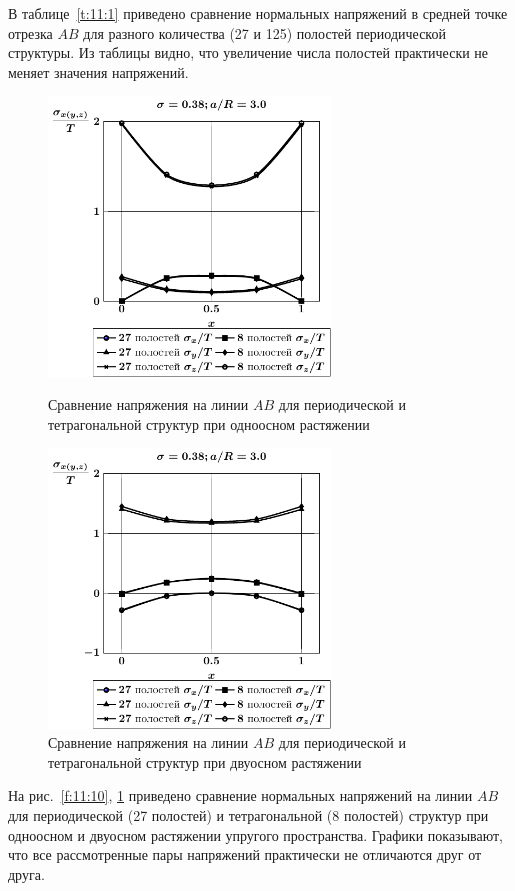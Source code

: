 В таблице~\ref{t:11:1} приведено сравнение нормальных напряжений в средней точке отрезка $AB$ для разного количества (27 и 125) полостей периодической структуры. Из таблицы видно, что увеличение числа полостей практически не меняет значения напряжений.

\begin{figure}[h!]
\centering\footnotesize
\parbox[b]{7.5cm}{\centering\includegraphics[width=7.5cm]{spheres-cav27-8-a30-t1.pdf}
\caption{Сравнение напряжения на линии $AB$ для периодической и тетрагональной структур при одноосном растяжении
\label{f:11:10}}}\hfil\hfil
\parbox[b]{7.5cm}{\centering\includegraphics[width=7.5cm]{spheres-cav27-8-a30-t2.pdf}
\caption{Сравнение напряжения на линии $AB$ для периодической и тетрагональной структур при двуосном растяжении
\label{f:11:11}}}
\end{figure}

На рис.~\ref{f:11:10}, \ref{f:11:11} приведено сравнение нормальных напряжений на линии $AB$ для периодической (27 полостей) и тетрагональной (8 полостей) структур при одноосном и двуосном растяжении упругого пространства. Графики показывают, что все рассмотренные пары напряжений практически не отличаются друг от друга.

